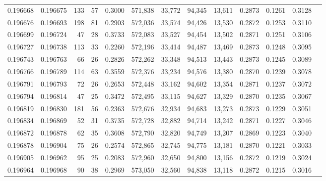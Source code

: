 \begin{tabular}{rrrrrrrrrrrrr}
0.196668 & 0.196675 &   133 &  57 &                                     0.3000 & 571,838 &  33,772 &  94,345 &  13,611 & 0.2873 & 0.1261 & 0.3128 \\
0.196676 & 0.196693 &   198 &  81 &                                     0.2903 & 572,036 &  33,574 &  94,426 &  13,530 & 0.2872 & 0.1253 & 0.3110 \\
0.196699 & 0.196724 &    47 &  28 &                                     0.3733 & 572,083 &  33,527 &  94,454 &  13,502 & 0.2871 & 0.1251 & 0.3106 \\
0.196727 & 0.196738 &   113 &  33 &                                     0.2260 & 572,196 &  33,414 &  94,487 &  13,469 & 0.2873 & 0.1248 & 0.3095 \\
0.196743 & 0.196763 &    66 &  26 &                                     0.2826 & 572,262 &  33,348 &  94,513 &  13,443 & 0.2873 & 0.1245 & 0.3089 \\
0.196766 & 0.196789 &   114 &  63 &                                     0.3559 & 572,376 &  33,234 &  94,576 &  13,380 & 0.2870 & 0.1239 & 0.3078 \\
0.196791 & 0.196793 &    72 &  26 &                                     0.2653 & 572,448 &  33,162 &  94,602 &  13,354 & 0.2871 & 0.1237 & 0.3072 \\
0.196794 & 0.196814 &    47 &  25 &                                     0.3472 & 572,495 &  33,115 &  94,627 &  13,329 & 0.2870 & 0.1235 & 0.3067 \\
0.196819 & 0.196830 &   181 &  56 &                                     0.2363 & 572,676 &  32,934 &  94,683 &  13,273 & 0.2873 & 0.1229 & 0.3051 \\
0.196834 & 0.196869 &    52 &  31 &                                     0.3735 & 572,728 &  32,882 &  94,714 &  13,242 & 0.2871 & 0.1227 & 0.3046 \\
0.196872 & 0.196878 &    62 &  35 &                                     0.3608 & 572,790 &  32,820 &  94,749 &  13,207 & 0.2869 & 0.1223 & 0.3040 \\
0.196878 & 0.196904 &    75 &  26 &                                     0.2574 & 572,865 &  32,745 &  94,775 &  13,181 & 0.2870 & 0.1221 & 0.3033 \\
0.196905 & 0.196962 &    95 &  25 &                                     0.2083 & 572,960 &  32,650 &  94,800 &  13,156 & 0.2872 & 0.1219 & 0.3024 \\
0.196964 & 0.196968 &    90 &  38 &                                     0.2969 & 573,050 &  32,560 &  94,838 &  13,118 & 0.2872 & 0.1215 & 0.3016 \\

\end{tabular}
